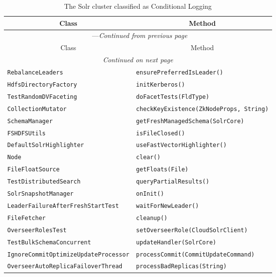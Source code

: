 \begin{center}
\begin{longtable}{ll}
\caption{The Solr cluster classified as Conditional Logging}\\
\toprule\multicolumn{1}{c}{Class}&\multicolumn{1}{c}{Method}\\\midrule
\endfirsthead

\multicolumn{2}{c}{\tablename\ \thetable{}---\textit{Continued from previous page}} \\\midrule
\multicolumn{1}{c}{Class}&\multicolumn{1}{c}{Method}\\\midrule
\endhead
\multicolumn{2}{c}{\textit{Continued on next page}}\\\midrule
\endfoot
\bottomrule
\endlastfoot
\lstinline/RebalanceLeaders/&{\lstinline/ensurePreferredIsLeader()/}\\
\lstinline/HdfsDirectoryFactory/&{\lstinline/initKerberos()/}\\
\lstinline/TestRandomDVFaceting/&{\lstinline/doFacetTests(FldType)/}\\
\lstinline/CollectionMutator/&{\lstinline/checkKeyExistence(ZkNodeProps, String)/}\\
\lstinline/SchemaManager/&{\lstinline/getFreshManagedSchema(SolrCore)/}\\
\lstinline/FSHDFSUtils/&{\lstinline/isFileClosed()/}\\
\lstinline/DefaultSolrHighlighter/&{\lstinline/useFastVectorHighlighter()/}\\
\lstinline/Node/&{\lstinline/clear()/}\\
\lstinline/FileFloatSource/&{\lstinline/getFloats(File)/}\\
\lstinline/TestDistributedSearch/&{\lstinline/queryPartialResults()/}\\
\lstinline/SolrSnapshotManager/&{\lstinline/onInit()/}\\
\lstinline/LeaderFailureAfterFreshStartTest/&{\lstinline/waitForNewLeader()/}\\
\lstinline/FileFetcher/&{\lstinline/cleanup()/}\\
\lstinline/OverseerRolesTest/&{\lstinline/setOverseerRole(CloudSolrClient)/}\\
\lstinline/TestBulkSchemaConcurrent/&{\lstinline/updateHandler(SolrCore)/}\\
\lstinline/IgnoreCommitOptimizeUpdateProcessor/&{\lstinline/processCommit(CommitUpdateCommand)/}\\
\lstinline/OverseerAutoReplicaFailoverThread/&{\lstinline/processBadReplicas(String)/}\\

\end{longtable}
\end{center}
